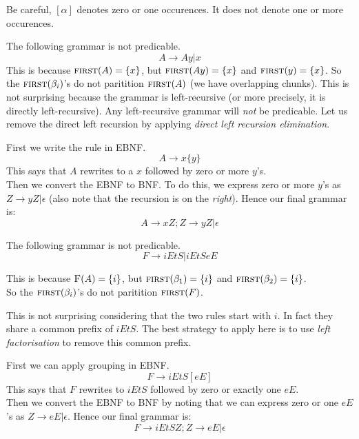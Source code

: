 Be careful, $[\alpha]$ denotes zero or one occurences. 
It does not denote one or more occurences. 

\frmrule

\begin{example}
The following grammar is not predicable. 
$$A \rightarrow Ay | x$$
This is because $\textsc{first}(A) = \{ x \}$, 
but $\textsc{first}(Ay) = \{ x \}$ and  $\textsc{first}(y) = \{ x \}$. 
So the $\textsc{first}(\beta_i)$'s do not paritition $\textsc{first}(A)$ (we have overlapping chunks). 
This is not surprising because the grammar is left-recursive (or more precisely, it 
is directly left-recursive). Any left-recursive grammar will \textit{not} be predicable. 
Let us remove the direct left recursion 
by applying \textit{direct left recursion elimination}. 

First we write the rule in EBNF. 
$$A \rightarrow x\{y\}$$
This says that $A$ rewrites to a $x$ followed by zero or more $y$'s.\\
Then we convert the EBNF to BNF.
To do this, we express zero or more $y$'s as $Z \rightarrow yZ | \epsilon$
(also note that the recursion is on the \textit{right}). 
Hence our final grammar is:
$$A \rightarrow xZ; Z \rightarrow yZ | \epsilon$$
\end{example}

\frmrule

\begin{example}
The following grammar is not predicable. 
$$F \rightarrow i E t S | i E t S e E $$

This is because $\textsc{F}(A) = \{ i \}$, 
but $\textsc{first}(\beta_1) = \{ i \}$ and  $\textsc{first}(\beta_2) = \{ i \}$. \\
So the $\textsc{first}(\beta_i)$'s do not paritition $\textsc{first}(F)$.

This is not surprising considering that the two rules start with $i$.
In fact they share a common prefix of $i E t S$. 
The best strategy to apply here is to use \textit{left factorisation} to remove this common prefix. 

First we can apply grouping in EBNF. 
$$F \rightarrow i E t S [eE]$$
This says that $F$ rewrites to $i E t S$ followed by zero or exactly one $eE$.\\
Then we convert the EBNF to BNF by noting 
that we can express zero or one $eE$'s as $Z \rightarrow eE | \epsilon$.
Hence our final grammar is:
$$F \rightarrow i E t S Z; Z \rightarrow eE | \epsilon$$
\end{example}



